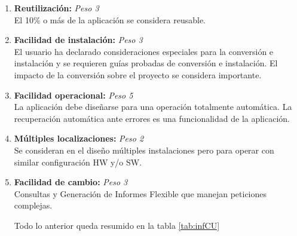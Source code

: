 \documentclass[11pt,a4paper,spanish,twoside]{book}
\begin{document}
\begin{enumerate}[{\bf 1.}]
\item {\bf Reutilización:} \emph{Peso 3} \\ El 10\% o más de la aplicación se
  considera reusable. 

\item {\bf Facilidad de instalación:} \emph{Peso 3} \\ El usuario ha declarado
  consideraciones especiales para la conversión e instalación y se requieren
  guías probadas de conversión e instalación. El impacto de la conversión
  sobre el proyecto se considera importante. 

\item {\bf Facilidad operacional:} \emph{Peso 5} \\ La aplicación debe diseñarse
  para una operación totalmente automática. La recuperación automática ante
  errores es una funcionalidad de la aplicación. 

\item {\bf Múltiples localizaciones:} \emph{Peso 2} \\ Se consideran en el
  diseño múltiples instalaciones pero para operar con similar configuración HW
  y/o SW.

\item {\bf Facilidad de cambio:} \emph{Peso 3} \\ Consultas y Generación de
  Informes Flexible que manejan peticiones complejas.

Todo lo anterior queda resumido en la tabla \ref{tab:infCU}

\end{enumerate}
\end{document}
